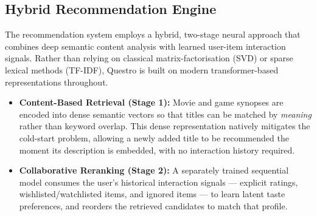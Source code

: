 \subsection{Hybrid Recommendation Engine}
The recommendation system employs a hybrid, two-stage neural approach that combines deep semantic content analysis with learned user-item interaction signals. Rather than relying on classical matrix-factorisation (SVD) \cite{ref:matrix_factorization} or sparse lexical methods (TF-IDF), Questro is built on modern transformer-based representations \cite{vaswani2017attention} throughout.
\begin{itemize}
    \item \textbf{Content-Based Retrieval (Stage 1):} Movie and game synopses are encoded into dense semantic vectors so that titles can be matched by \textit{meaning} rather than keyword overlap. This dense representation natively mitigates the cold-start problem, allowing a newly added title to be recommended the moment its description is embedded, with no interaction history required.
    \item \textbf{Collaborative Reranking (Stage 2):} A separately trained sequential model consumes the user's historical interaction signals --- explicit ratings, wishlisted/watchlisted items, and ignored items --- to learn latent taste preferences, and reorders the retrieved candidates to match that profile.
\end{itemize}

